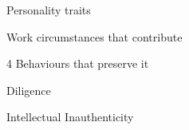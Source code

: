 \documentclass[aspectratio=169]{beamer}
\begin{document}
\begin{frame}
  \begin{center}
    \Huge Personality traits
    \\ \small \cite{hh15}
  \end{center}
\end{frame}

\begin{frame}
  \begin{center}
    \Huge Work circumstances that contribute
    \\ \small \cite{hh15}
  \end{center}
\end{frame}


\begin{frame}
  \begin{center}
    \Huge 4 Behaviours that preserve it
  \end{center}
\end{frame}

\begin{frame}
  \begin{center}
    \Huge Diligence
    \\ \small \cite{clanceimes78}

  \end{center}
\end{frame}

\begin{frame}
  \begin{center}
    \Huge Intellectual Inauthenticity

    \\ \small \cite{clanceimes78}
  \end{center}
\end{frame}
\end{document}
